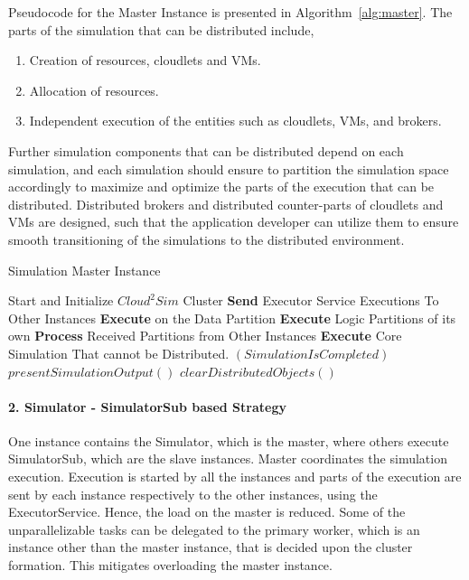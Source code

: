 Pseudocode for the Master Instance is presented in Algorithm~\ref{alg:master}. The parts of the simulation that can be distributed include,
\begin{enumerate}[i]
  \item Creation of resources, cloudlets and VMs.
  \item Allocation of resources.
  \item Independent execution of the entities such as cloudlets, VMs, and brokers.
\end{enumerate}
Further simulation components that can be distributed depend on each simulation, and each simulation should ensure to partition the simulation space accordingly to maximize and optimize the parts of the execution that can be distributed. Distributed brokers and distributed counter-parts of cloudlets and VMs are designed, such that the application developer can utilize them to ensure smooth transitioning of the simulations to the distributed environment.

\begin{algorithm}
  \caption{Simulation Master Instance}
\label{alg:master}
  \begin{algorithmic}
\State Start and Initialize $Cloud^{2}Sim$ Cluster
\Repeat
{}
\State \textbf{Send} Executor Service Executions To Other Instances
\State \textbf{Execute} on the Data Partition
\State \textbf{Execute} Logic Partitions of its own
\EndWhile
\State \textbf{Process} Received Partitions from Other Instances
\State \textbf{Execute} Core Simulation That cannot be Distributed.
\Until $(SimulationIsCompleted)$
\State $presentSimulationOutput()$
\State $clearDistributedObjects()$ 
  \end{algorithmic}
\end{algorithm}

\paragraph*{2. Simulator - SimulatorSub based Strategy}
One instance contains the Simulator, which is the master, where others execute SimulatorSub, which are the slave instances. Master coordinates the simulation execution. Execution is started by all the instances and parts of the execution are sent by each instance respectively to the other instances, using the ExecutorService. Hence, the load on the master is reduced. Some of the unparallelizable tasks can be delegated to the primary worker, which is an instance other than the master instance, that is decided upon the cluster formation. This mitigates overloading the master instance.


